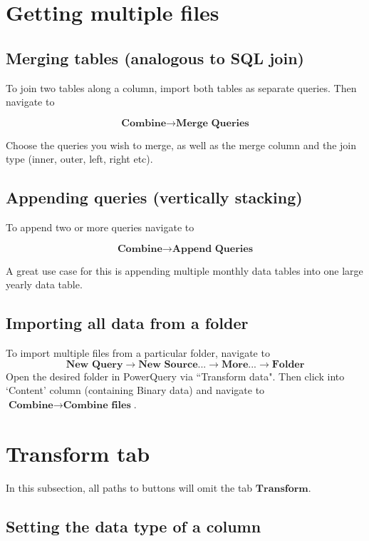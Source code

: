 \documentclass[10pt, openany, twocolumn]{book}
\begin{document}
\section{Getting multiple files}

\subsection*{Merging tables (analogous to SQL join)}

To join two tables along a column, import both tables as separate queries. Then navigate to 

$$\textbf{Combine} \rightarrow \textbf{Merge Queries}$$

Choose the queries you wish to merge, as well as the merge column and the join type (inner, outer, left, right etc).

\subsection*{Appending queries (vertically stacking)}

To append two or more queries navigate to 

$$\textbf{Combine} \rightarrow \textbf{Append Queries}$$

A great use case for this is appending multiple monthly data tables into one large yearly data table.

\subsection*{Importing all data from a folder}

To import multiple files from a particular folder, navigate to 
$$ \textbf{New Query} \rightarrow \textbf{New Source...} \rightarrow \textbf{More...} \rightarrow \textbf{Folder}    $$
Open the desired folder in PowerQuery via ``Transform data". Then click into `Content' column (containing Binary data) and navigate to $\textbf{Combine} \rightarrow \textbf{Combine files}$.

\section{Transform tab}

In this subsection, all paths to buttons will omit the tab $\textbf{Transform}$.

\subsection*{Setting the data type of a column}
\end{document}
